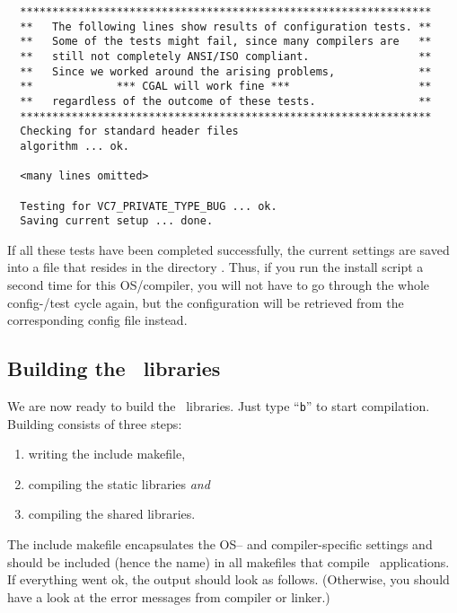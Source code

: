 {\ccTexHtml{\scriptsize}{}
\begin{verbatim}
  ****************************************************************
  **   The following lines show results of configuration tests. **
  **   Some of the tests might fail, since many compilers are   **
  **   still not completely ANSI/ISO compliant.                 **
  **   Since we worked around the arising problems,             **
  **             *** CGAL will work fine ***                    **
  **   regardless of the outcome of these tests.                **
  ****************************************************************
  Checking for standard header files
  algorithm ... ok.

  <many lines omitted>

  Testing for VC7_PRIVATE_TYPE_BUG ... ok.
  Saving current setup ... done.
\end{verbatim}
}

If all these tests have been completed successfully, the current
settings are saved into a file that resides in the directory
\cgalinstconfdir. Thus, if you run the install script a second time
for this OS/compiler, you will not have to go through the whole
config-/test cycle again, but the configuration will be retrieved from
the corresponding config file instead.

\subsection{Building the \cgal\ libraries}\label{sec:build-the-libs}

We are now ready to build the \cgal\ libraries.  Just type ``{\tt b}''
to start compilation. Building consists of three steps:
\begin{enumerate}
\item writing the include makefile,
\item compiling the static libraries \textit{and}
\item compiling the shared libraries.
\end{enumerate}
The include makefile encapsulates the OS-- and
compiler-specific settings and should be included (hence the name) in
all makefiles that compile \cgal\ applications. If everything went ok,
the output should look as follows. (Otherwise, you should have a look
at the error messages from compiler or linker.)

